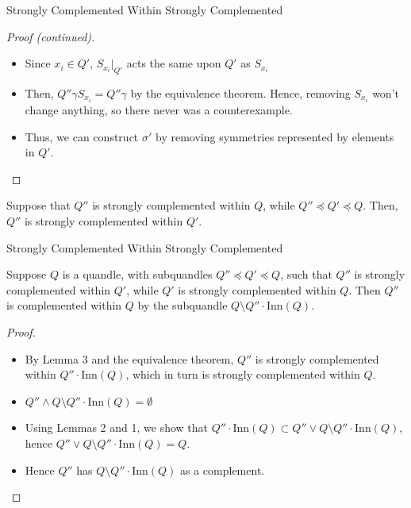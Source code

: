 \documentclass[10pt]{beamer}
\newcommand{\sq}{\preccurlyeq} %
\newcommand{\Inn}{\mathrm{Inn}} %
\theoremstyle{plain}
\begin{document}
    \begin{frame}{Strongly Complemented Within Strongly Complemented}

        \begin{proof}[Proof (\textit{continued})]
        
        \begin{itemize}
            \item Since $x_i\in Q'$, $S_{x_i}|_{Q'}$ acts the same upon $Q'$ as $S_{x_i}$
            \item Then, $Q''\gamma S_{x_i} = Q''\gamma$ by the equivalence theorem. Hence, removing $S_{x_i}$ won't change anything, so there never was a counterexample.
            \item Thus, we can construct $\sigma'$ by removing symmetries represented by elements in $Q'$.
        \end{itemize}
         
        \end{proof}
        
        
        \begin{lemma}[3]
        
        Suppose that $Q''$ is strongly complemented within $Q$, while $Q''\sq Q'\sq Q$. Then, $Q''$ is strongly complemented within $Q'$.
        
        \end{lemma}
        
        \end{frame}
        
        \begin{frame}{Strongly Complemented Within Strongly Complemented}
        
        \begin{theorem}
        Suppose $Q$ is a quandle, with subquandles $Q''\sq Q'\sq Q$, such that $Q''$ is strongly complemented within $Q'$, while $Q'$ is strongly complemented within $Q$. Then $Q''$ is complemented within $Q$ by the subquandle $Q\setminus Q''\cdot \Inn(Q)$.
        \end{theorem}
        \pause
        
        \begin{proof}
        \begin{itemize}
            \item By Lemma 3 and the equivalence theorem, $Q''$ is strongly complemented within $Q''\cdot \Inn(Q)$, which in turn is strongly complemented within $Q$.
            \item $Q''\wedge Q\setminus Q''\cdot \Inn(Q) = \emptyset$
            \item Using Lemmas 2 and 1, we show that $Q''\cdot \Inn(Q) \subset Q''\vee Q\setminus Q''\cdot \Inn(Q)$, hence $Q''\vee Q\setminus Q''\cdot \Inn(Q) = Q$.
            \item Hence $Q''$ has $Q\setminus Q''\cdot \Inn(Q)$ as a complement.
        \end{itemize}
        \end{proof}
            
        \end{frame}
\end{document}
